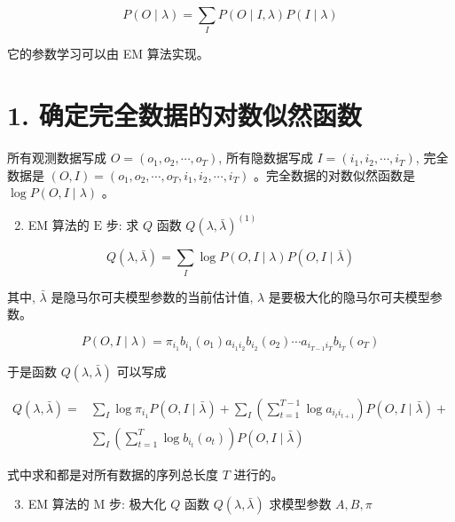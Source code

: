\documentclass[10pt]{article}
\begin{document}
\begin{equation*}
P(O \mid \lambda)=\sum_{I} P(O \mid I, \lambda) P(I \mid \lambda) \tag{10.32}
\end{equation*}


它的参数学习可以由 EM 算法实现。

\section*{1. 确定完全数据的对数似然函数}
所有观测数据写成 $O=\left(o_{1}, o_{2}, \cdots, o_{T}\right)$, 所有隐数据写成 $I=\left(i_{1}, i_{2}, \cdots, i_{T}\right)$, 完全数据是 $(O, I)=\left(o_{1}, o_{2}, \cdots, o_{T}, i_{1}, i_{2}, \cdots, i_{T}\right)$ 。完全数据的对数似然函数是 $\log P(O, I \mid \lambda)$ 。

\begin{enumerate}
  \setcounter{enumi}{1}
  \item EM 算法的 $\mathrm{E}$ 步: 求 $Q$ 函数 $Q(\lambda, \bar{\lambda})^{(1)}$
\end{enumerate}


\begin{equation*}
Q(\lambda, \bar{\lambda})=\sum_{I} \log P(O, I \mid \lambda) P(O, I \mid \bar{\lambda}) \tag{10.33}
\end{equation*}


其中, $\bar{\lambda}$ 是隐马尔可夫模型参数的当前估计值, $\lambda$ 是要极大化的隐马尔可夫模型参数。

$$
P(O, I \mid \lambda)=\pi_{i_{1}} b_{i_{1}}\left(o_{1}\right) a_{i_{1} i_{2}} b_{i_{2}}\left(o_{2}\right) \cdots a_{i_{T-1} i_{T}} b_{i_{T}}\left(o_{T}\right)
$$

于是函数 $Q(\lambda, \bar{\lambda})$ 可以写成


\begin{align*}
Q(\lambda, \bar{\lambda})= & \sum_{I} \log \pi_{i_{1}} P(O, I \mid \bar{\lambda})+\sum_{I}\left(\sum_{t=1}^{T-1} \log a_{i_{t} i_{t+1}}\right) P(O, I \mid \bar{\lambda})+ \\
& \sum_{I}\left(\sum_{t=1}^{T} \log b_{i_{t}}\left(o_{t}\right)\right) P(O, I \mid \bar{\lambda}) \tag{10.34}
\end{align*}


式中求和都是对所有数据的序列总长度 $T$ 进行的。

\begin{enumerate}
  \setcounter{enumi}{2}
  \item EM 算法的 $\mathrm{M}$ 步: 极大化 $Q$ 函数 $Q(\lambda, \bar{\lambda})$ 求模型参数 $A, B, \pi$
\end{enumerate}
\end{document}
